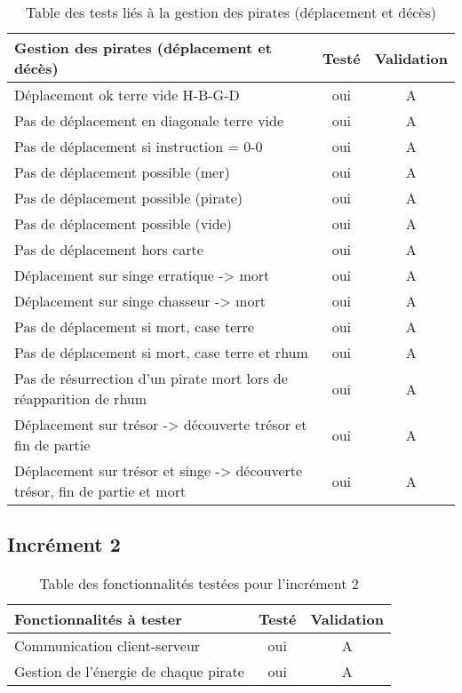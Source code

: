 \begin{table}[!h]
\begin{center}
\begin{tabular}{|p{10cm}|c|c|}
\hline
\textbf{Gestion des pirates (déplacement et décès) } & \textbf{Testé} & \textbf{Validation} \\\hline
Déplacement ok terre vide H-B-G-D				& oui & A \\\hline
Pas de déplacement en diagonale terre vide		& oui & A \\\hline
Pas de déplacement si instruction = 0-0			& oui & A \\\hline
Pas de déplacement possible (mer)				& oui & A \\\hline
Pas de déplacement possible (pirate)			& oui & A \\\hline
Pas de déplacement possible (vide)				& oui & A \\\hline
Pas de déplacement hors carte					& oui & A \\\hline
Déplacement sur singe erratique -> mort			& oui & A \\\hline
Déplacement sur singe chasseur -> mort			& oui & A \\\hline
Pas de déplacement si mort, case terre			& oui & A \\\hline
Pas de déplacement si mort, case terre et rhum	& oui & A \\\hline
Pas de résurrection d'un pirate mort lors de réapparition de rhum	& oui & A \\\hline
Déplacement sur trésor -> découverte trésor et fin de partie		& oui & A \\\hline
Déplacement sur trésor et singe -> découverte trésor, fin de partie et mort & oui & A \\\hline

\end{tabular}
\end{center}
\caption{Table des tests liés à la gestion des pirates (déplacement et décès) }
\end{table}

\newpage
	\subsection{Incrément 2}
\begin{table}[!h]
\begin{center}
\begin{tabular}{|p{10cm}|c|c|}
\hline
\textbf{Fonctionnalités à tester} & \textbf{Testé} & \textbf{Validation} \\
\hline
Communication client-serveur & oui & A \\\hline
Gestion de l’énergie de chaque pirate & oui & A \\\hline
\end{tabular}
\end{center}
\caption{Table des fonctionnalités testées pour l'incrément 2}
\end{table}

